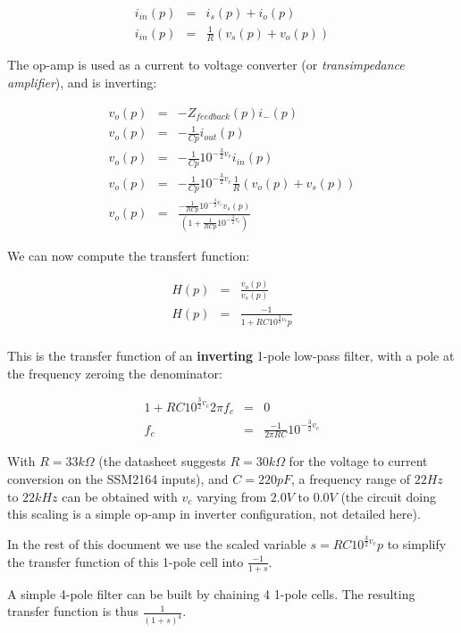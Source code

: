 \documentclass[a4paper,10pt]{article}
\begin{document}
\begin{eqnarray*}
i_{in}(p) &=& i_s(p) + i_o(p) \\
i_{in}(p) &=& \frac{1}{R}(v_s(p) + v_o(p))
\end{eqnarray*}

The op-amp is used as a current to voltage converter (or \emph{transimpedance amplifier}), and is inverting:

\begin{eqnarray*}
v_o(p) &=& -Z_{feedback}(p) i_-(p) \\
v_o(p) &=& -\frac{1}{Cp} i_{out}(p) \\
v_o(p) &=& -\frac{1}{Cp} 10^{-\frac{3}{2} v_c} i_{in}(p) \\
v_o(p) &=& -\frac{1}{Cp} 10^{-\frac{3}{2} v_c} \frac{1}{R}(v_o(p) + v_s(p)) \\
v_o(p) &=& \frac{-\frac{1}{RCp} 10^{-\frac{3}{2} v_c}v_s(p)}{\left(1 + \frac{1}{RCp} 10^{-\frac{3}{2} v_c} \right)}
\end{eqnarray*}

We can now compute the transfert function:

\begin{eqnarray*}
H(p) &=& \frac{v_o(p)}{v_s(p)} \\
H(p) &=& \frac{-1}{1 + RC 10^{\frac{3}{2} v_c} p} \\
\end{eqnarray*}

This is the transfer function of an \textbf{inverting} 1-pole low-pass filter, with a pole at the frequency zeroing the denominator:

\begin{eqnarray*}
1 + RC 10^{\frac{3}{2} v_c} 2 \pi f_c &=& 0 \\
f_c &=& \frac{-1}{2 \pi RC} 10^{-\frac{3}{2} v_c}
\end{eqnarray*}

With $R = 33k\Omega$ (the datasheet suggests $R = 30k\Omega$ for the voltage to current conversion on the SSM2164 inputs), and $C = 220pF$, a frequency range of $22Hz$ to $22kHz$ can be obtained with $v_c$ varying from $2.0V$ to $0.0V$ (the circuit doing this scaling is a simple op-amp in inverter configuration, not detailed here).

In the rest of this document we use the scaled variable $s = RC 10^{\frac{3}{2} v_c} p$ to simplify the transfer function of this 1-pole cell into $\frac{-1}{1 + s}$.

A simple 4-pole filter can be built by chaining 4 1-pole cells. The resulting transfer function is thus $\frac{1}{(1 + s)^4}$.
\end{document}
